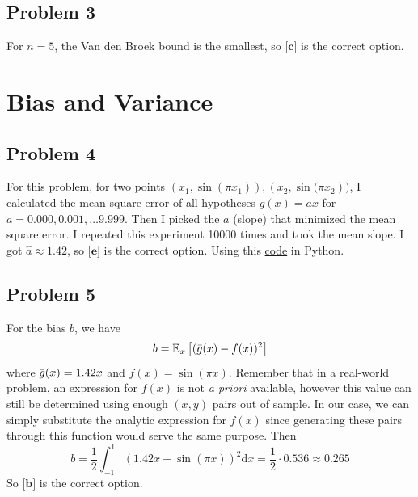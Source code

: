\documentclass{article}
\begin{document}
\subsection*{Problem 3}
For $n = 5$, the Van den Broek bound is the smallest, so $\textbf{[c]}$ is the correct option.
\section*{Bias and Variance}
\subsection*{Problem 4}
For this problem, for two points $(x_{1}, \sin(\pi x_{1})), (x_{2}, \sin{(\pi x_{2}}))$, I calculated the mean square error of all hypotheses $g(x) = ax$ for $a = 0.000,0.001,\dots 9.999$. Then I picked the $a$ (slope) that minimized the mean square error. I repeated this experiment 10000 times and took the mean slope. I got $\hat{a} \approx 1.42$, so $\textbf{[e]}$ is the correct option. Using this \hyperref[prob4]{code} in Python.
\subsection*{Problem 5}
For the bias $b$, we have
\begin{equation*}
    b = \mathbb{E}_{x}\left[(\Bar{g}(x) - f(x))^{2}\right]
\end{equation*}
where $\Bar{g}(x) = 1.42x$ and $f(x) = \sin{(\pi x)}$. Remember that in a real-world problem, an expression for $f(x)$ is not \emph{a priori} available, however this value can still be determined using enough $(x,y)$ pairs out of sample. In our case, we can simply substitute the analytic expression for $f(x)$ since generating these pairs through this function would serve the same purpose. Then
\begin{equation*}
    b = \frac{1}{2}\int_{-1}^{1}(1.42x - \sin{(\pi x)})^2\text{d}x = \frac{1}{2}\cdot 0.536 \approx 0.265
\end{equation*}
So $\textbf{[b]}$ is the correct option.
\newpage
\end{document}
